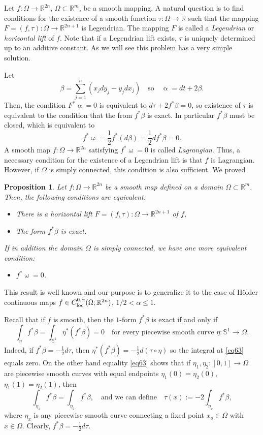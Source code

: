 \documentclass[intlimits,12pt,reqno]{amsart}
\newcommand{\Sph}{\mathbb S}
\newcommand{\R}{\mathbb R}
\numberwithin{equation}{section}
\newtheorem{proposition}[theorem]{Proposition}
\theoremstyle{definition}
\begin{document}
Let $f:\Omega\to\R^{2n}$, $\Omega\subset \R^m$, be a smooth mapping. A natural question is to find conditions for the existence of a smooth function $\tau:\Omega\to\R$ such that the mapping
$F=(f,\tau):\Omega\to\R^{2n+1}$ is Legendrian. The mapping $F$ is called a \emph{Legendrian} or \emph{horizontal lift} of $f$. 
Note that if a Legendrian lift exists, $\tau$ is uniquely determined up to an additive constant.
As we will see this problem has a very simple solution.

Let
$$
\beta=\sum_{j=1}^n (x_jd y_j-y_jdx_j)
\quad
\text{so}
\quad
\upalpha=dt+2\beta.
$$
Then, the condition $F^*\upalpha=0$ is equivalent to $d\tau+2f^*\beta=0$, so existence of $\tau$ is equivalent to the condition that the from $f^*\beta$ is exact. In particular $f^*\beta$ must be closed, which is equivalent to
$$
f^*\upomega=\frac{1}{2}f^*(d\beta)=\frac{1}{2}df^*\beta=0.
$$
A smooth map $f:\Omega\to\R^{2n}$ satisfying $f^*\upomega=0$ is called \emph{Lagrangian}. Thus, a necessary condition for the existence of a Legendrian lift is that $f$ is Lagrangian. However, if $\Omega$ is simply connected, this condition is also sufficient. We proved
\begin{proposition}
\label{T68}
Let $f:\Omega\to\R^{2n}$ be a smooth map defined on a domain $\Omega\subset\R^m$. Then, the following conditions are equivalent.
\begin{itemize}
\item[(a)] There is a horizontal lift $F=(f,\tau):\Omega\to\R^{2n+1}$ of $f$,
\item[(b)] The form $f^*\beta$ is exact.
\end{itemize}
If in addition the domain $\Omega$ is simply connected, we have one more equivalent condition:
\begin{itemize}
\item[(c)] $f^*\upomega=0$.
\end{itemize}
\end{proposition}
This result is well known and our purpose is to generalize it to the case of H\"older continuous maps $f\in C^{0,\alpha}_{\rm loc}(\Omega;\R^{2n})$, $1/2<\alpha\leq 1$.

Recall that if $f$ is smooth, then the $1$-form $f^*\beta$ is exact if and only if
\begin{equation}
\label{eq63}
\int_\eta f^*\beta=\int_{\Sph^1}\eta^*(f^*\beta)=0
\quad
\text{for every piecewise smooth curve $\eta:\Sph^1\to\Omega$.}
\end{equation}
Indeed, if $f^*\beta=-\frac{1}{2}d\tau$, then $\eta^*(f^*\beta)=-\frac{1}{2}d(\tau\circ\eta)$ so the integral at \eqref{eq63} equals zero. On the other hand equality \eqref{eq63}
shows that if $\eta_1,\eta_2:[0,1]\to\Omega$ are piecewise smooth curves with equal endpoints
$\eta_1(0)=\eta_2(0)$, $\eta_1(1)=\eta_2(1)$, then
$$
\int_{\eta_1} f^*\beta=\int_{\eta_2} f^*\beta,
\quad
\text{and we can define}
\quad
\tau(x):= -2\int_{\eta_x} f^*\beta,
$$
where $\eta_x$ is any piecewise smooth curve connecting a fixed point $x_o\in\Omega$ with $x\in\Omega$. Clearly, $f^*\beta=-\frac{1}{2}d\tau$.
\end{document}
